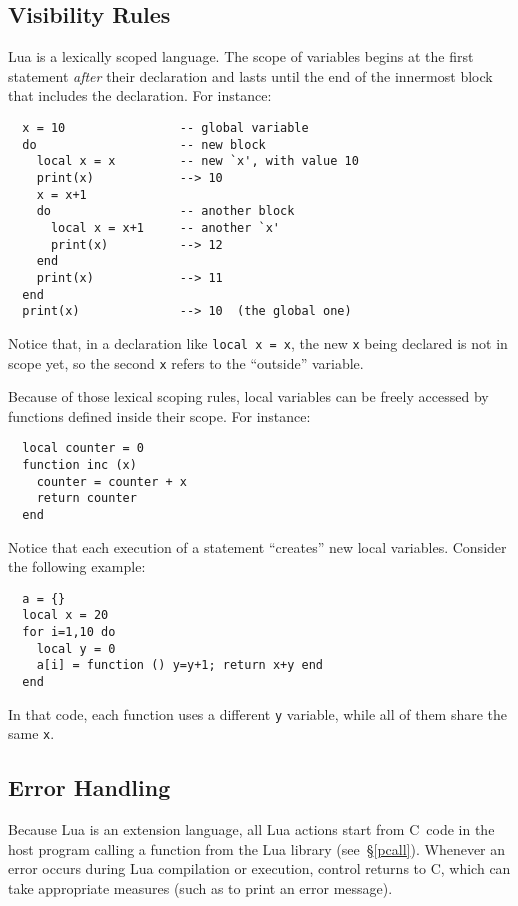 \documentclass[11pt,twoside,draft]{article}
\makeatletter
\newcommand{\See}[1]{\S\ref{#1}}
\newcommand{\see}[1]{(see~\See{#1})}
\newcommand{\Index}[1]{#1\index{#1@{\lowercase{#1}}}}
\makeatother
\begin{document}
\subsection{Visibility Rules} \label{visibility}

Lua is a lexically scoped language.
The scope of variables begins at the first statement \emph{after}
their declaration and lasts until the end of the innermost block that
includes the declaration.
For instance:
\begin{verbatim}
  x = 10                -- global variable
  do                    -- new block
    local x = x         -- new `x', with value 10
    print(x)            --> 10
    x = x+1
    do                  -- another block
      local x = x+1     -- another `x'
      print(x)          --> 12
    end
    print(x)            --> 11
  end
  print(x)              --> 10  (the global one)
\end{verbatim}
Notice that, in a declaration like \verb|local x = x|,
the new \verb|x| being declared is not in scope yet,
so the second \verb|x| refers to the ``outside'' variable.

Because of those \Index{lexical scoping} rules,
local variables can be freely accessed by functions
defined inside their scope.
For instance:
\begin{verbatim}
  local counter = 0
  function inc (x)
    counter = counter + x
    return counter
  end
\end{verbatim}

Notice that each execution of a  statement
``creates'' new local variables.
Consider the following example:
\begin{verbatim}
  a = {}
  local x = 20
  for i=1,10 do
    local y = 0
    a[i] = function () y=y+1; return x+y end
  end
\end{verbatim}
In that code,
each function uses a different \verb|y| variable,
while all of them share the same \verb|x|.

\subsection{Error Handling} \label{error}

Because Lua is an extension language,
all Lua actions start from C~code in the host program
calling a function from the Lua library \see{pcall}.
Whenever an error occurs during Lua compilation or execution,
control returns to C,
which can take appropriate measures
(such as to print an error message).
\end{document}
